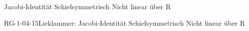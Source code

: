 Jacobi-Identität
Schiefsymmetrisch
Nicht linear über R

\begin{REM}{RG-1-04-15}{Lieklammer:
Jacobi-Identität
Schiefsymmetrisch
Nicht linear über R}
\end{REM}
